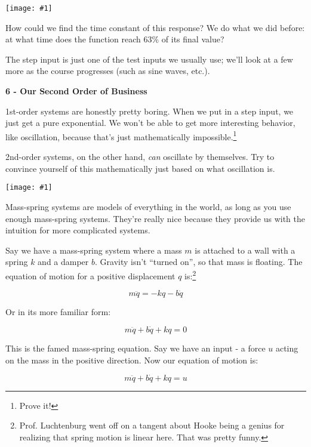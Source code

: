 \documentclass{article}
\newcommand{\bicture}[1]{\begin{center}
    {\texttt{[image: \#1]}}
\end{center}}
\begin{document}
\begin{onehalfspacing}
\begin{flushleft}
\bicture{2_step}

How could we find the time constant of this response? We do what we did before: at what time does the function reach 63\% of its final value?

\medskip

The step input is just one of the test inputs we usually use; we'll look at a few more as the course progresses (such as sine waves, etc.).

\bigskip
\large\textbf{6 - Our Second Order of Business} \\
\normalsize

1st-order systems are honestly pretty boring. When we put in a step input, we just get a pure exponential. We won't be able to get more interesting behavior, like oscillation, because that's just mathematically impossible.\footnote[4]{Prove it!}

\medskip

2nd-order systems, on the other hand, \textit{can} oscillate by themselves. Try to convince yourself of this mathematically just based on what oscillation is.

\bicture{2_unf}

Mass-spring systems are models of everything in the world, as long as you use enough mass-spring systems. They're really nice because they provide us with the intuition for more complicated systems. 

\medskip

Say we have a mass-spring system where a mass \(m\) is attached to a wall with a spring \(k\) and a damper \(b\). Gravity isn't ``turned on'', so that mass is floating. The equation of motion for a positive displacement \(q\) is:\footnote[1]{Prof. Luchtenburg went off on a tangent about Hooke being a genius for realizing that spring motion is linear here. That was pretty funny.}

\vspace{-0.1in}
\[m\ddot{q} = -kq - b\dot{q}\]

Or in its more familiar form:

\vspace{-0.1in}
\[m\ddot{q} + b\dot{q} + kq = 0\]

This is the famed mass-spring equation. Say we have an input - a force \(u\) acting on the mass in the positive direction. Now our equation of motion is:

\vspace{-0.1in}
\[m\ddot{q} + b\dot{q} + kq = u\]

\end{flushleft}
\end{onehalfspacing}
\end{document}
